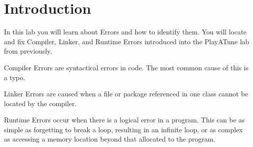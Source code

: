 \section{Introduction}
In this lab you will learn about Errors and how to identify them. You will locate and fix Compiler, Linker, and Runtime Errors introduced into the PlayATune lab from previously.
\begin{flushleft}
Compiler Errors are syntactical errors in code. The most common cause of this is a typo.
\end{flushleft}
\begin{flushleft}
Linker Errors are caused when a file or package referenced in one class cannot be located by the compiler.
\end{flushleft}
\begin{flushleft}
Runtime Errors occur when there is a logical error in a program. This can be as simple as forgetting to break a loop, resulting in an infinite loop, or as complex as accessing a memory location beyond that allocated to the program.
\end{flushleft}